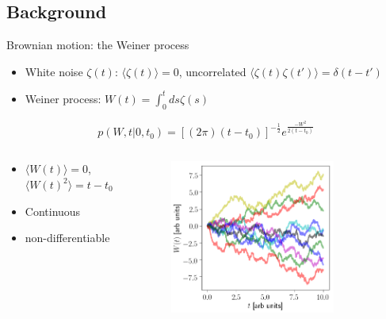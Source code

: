 \documentclass[]{beamer}
\newcommand {\be}{\begin{equation*}}
\newcommand {\ee}{\end{equation*}}
\newcommand{\expect}[1]{\langle#1\rangle}
\begin{document}
\subsection{Background}
\begin{frame}{Brownian motion: the Weiner process}
\begin{itemize}
  \setlength\itemsep{0.5em}
 \item White noise $\zeta(t)$: $\expect{\zeta(t)}=0$, uncorrelated $\expect{\zeta(t)\zeta(t')}=\delta(t-t')$
\item Weiner process: $W(t)=\int_0^t ds \zeta(s)$
\end{itemize}

\be
p(W, t| 0, t_0)=[(2\pi)(t-t_0)]^{-\frac{1}{2}}e^{\frac{-W^2}{2(t-t_0)}} \label{eq:pwien}
\ee
\begin{columns}
\begin{column}{0.475\textwidth}
\begin{itemize}
 \item $\expect{{W}(t)}=0$,  $\expect{W(t)^2}=t-t_0$
\item Continuous
\item non-differentiable
\end{itemize}
\end{column}
\begin{column}{0.475\textwidth}
\begin{figure}[t]
\vspace{-20pt}
\captionsetup[figure]{labelformat=empty}
\includegraphics[width=0.8\textwidth]{Weiner.png}
\end{figure}
\end{column}
\end{columns}
\end{frame}
\end{document}
